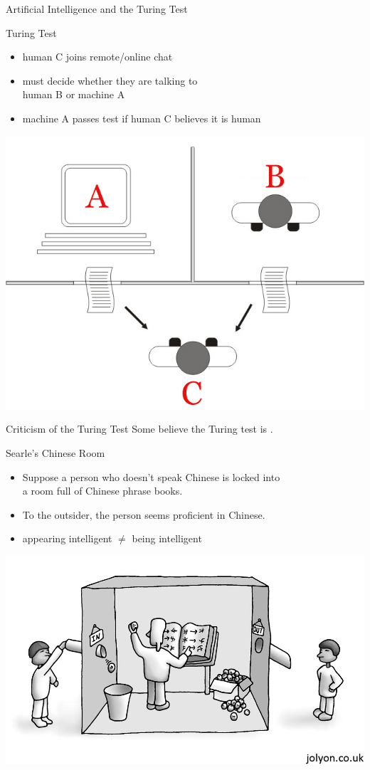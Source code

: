 \documentclass[xcolor={usenames,svgnames,x11names,dvipsnames,table}]{beamer}
\begin{document}
\begin{frame}{Artificial Intelligence and the Turing Test}
    \begin{block}{Turing Test}
        \begin{itemize}
            \item human C joins remote\slash online chat
            \item must decide whether they are talking to\\
                  human B or machine A
            \item machine A passes test if human C believes it is human
        \end{itemize}
    \end{block}

    \begin{center}
        \includegraphics[width=.55\linewidth]{./img/Turing_test_diagram.png}
    \end{center}
\end{frame}

\begin{frame}{Criticism of the Turing Test}
    Some believe the Turing test is .
    
        \begin{block}{Searle's Chinese Room}
            \begin{itemize}
                \item Suppose a person who doesn't speak Chinese is locked into\\ a room full of Chinese phrase books.
                \item To the outsider, the person seems proficient in Chinese. 
                \item appearing intelligent $\neq$ being intelligent
            \end{itemize}
        \end{block}

        \centering
        \includegraphics[width=.7\linewidth]{./img/chineseroom}
\end{frame}
\end{document}
